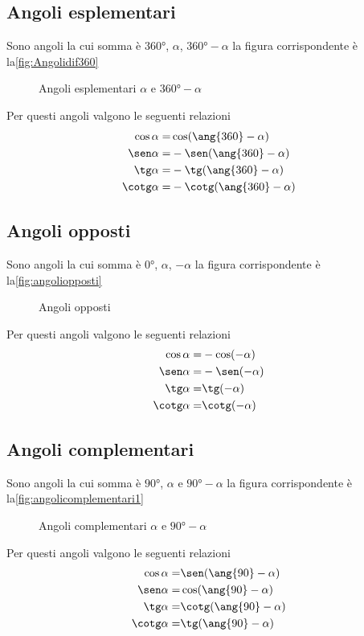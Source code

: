 \subsection{Angoli esplementari}
Sono angoli la cui somma è $\ang{360}$, $\alpha$, $\ang{360}-\alpha$ la figura corrispondente è la\nobs\vref{fig:Angolidif360}
\begin{figure}[H]
		\centering
			
			\caption{Angoli esplementari $\alpha$ e $\ang{360}-\alpha$}
			\label{fig:Angolidif360}
	\end{figure}
Per questi angoli valgono le seguenti relazioni
\begin{align*}
\cos\alpha=&{}\cos(\ang{360}-\alpha)\\
\sen\alpha=&{}-\sen(\ang{360}-\alpha)\\
\tg\alpha=&{}-\tg(\ang{360}-\alpha)\\
\cotg\alpha=&{}-\cotg(\ang{360}-\alpha)
\end{align*}
\subsection{Angoli opposti}
Sono angoli la cui somma è $\ang{0}$, $\alpha$, $-\alpha$ la figura corrispondente è la\nobs\vref{fig:angoliopposti}
\begin{figure}[H]
	\centering
	
	\caption{Angoli opposti}
	\label{fig:angoliopposti}
\end{figure}
Per questi angoli valgono le seguenti relazioni
\begin{align*}
\cos\alpha=&{}-\cos(-\alpha)\\
\sen\alpha=&{}-\sen(-\alpha)\\
\tg\alpha=&{}\tg(-\alpha)\\
\cotg\alpha=&{}\cotg(-\alpha)
\end{align*}
\subsection{Angoli complementari}
Sono angoli la cui somma è $\ang{90}$, $\alpha$ e $\ang{90}-\alpha$ la figura corrispondente è la\nobs\vref{fig:angolicomplementari1}
\begin{figure}[H]
	\centering
	
		\caption{Angoli complementari $\alpha$ e  $\ang{90}-\alpha$}
		\label{fig:angolicomplementari1}
\end{figure}
Per questi angoli valgono le seguenti relazioni
\begin{align*}
\cos\alpha=&{}\sen(\ang{90}-\alpha)\\
\sen\alpha=&{}\cos(\ang{90}-\alpha)\\
\tg\alpha=&{}\cotg(\ang{90}-\alpha)\\
\cotg\alpha=&{}\tg(\ang{90}-\alpha)
\end{align*}
